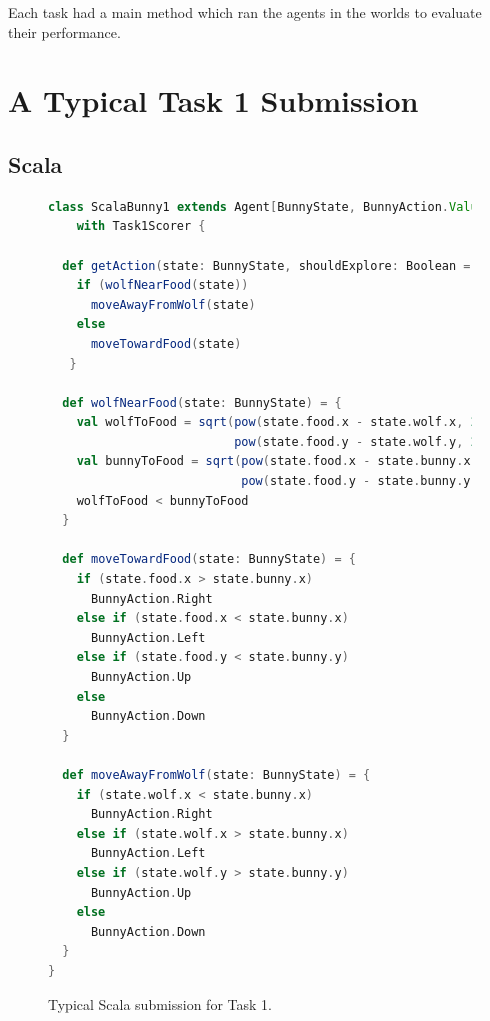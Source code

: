 Each task had a main method which ran the agents in the worlds to evaluate their performance.

\section{A Typical Task 1 Submission}

\subsection{Scala}



\begin{figure}[!h]
\begin{center}

\begin{lstlisting}[language=Scala]
class ScalaBunny1 extends Agent[BunnyState, BunnyAction.Value]
    with Task1Scorer {

  def getAction(state: BunnyState, shouldExplore: Boolean = false) = {
    if (wolfNearFood(state))
      moveAwayFromWolf(state)
    else
      moveTowardFood(state)
   }

  def wolfNearFood(state: BunnyState) = {
    val wolfToFood = sqrt(pow(state.food.x - state.wolf.x, 2) +
                          pow(state.food.y - state.wolf.y, 2))
    val bunnyToFood = sqrt(pow(state.food.x - state.bunny.x, 2) +
                           pow(state.food.y - state.bunny.y, 2))
    wolfToFood < bunnyToFood
  }

  def moveTowardFood(state: BunnyState) = {
    if (state.food.x > state.bunny.x)
      BunnyAction.Right
    else if (state.food.x < state.bunny.x)
      BunnyAction.Left
    else if (state.food.y < state.bunny.y)
      BunnyAction.Up
    else
      BunnyAction.Down
  }

  def moveAwayFromWolf(state: BunnyState) = {
    if (state.wolf.x < state.bunny.x)
      BunnyAction.Right
    else if (state.wolf.x > state.bunny.x)
      BunnyAction.Left
    else if (state.wolf.y > state.bunny.y)
      BunnyAction.Up
    else
      BunnyAction.Down
  }
}
\end{lstlisting}

\caption{Typical Scala submission for Task 1.}
\end{center}
\label{fig:scala-task1-submission}
\end{figure}

